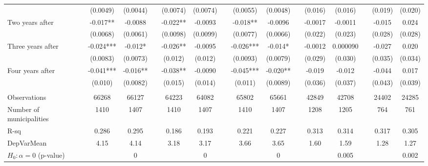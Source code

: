 \begin{tabular}{lcccccccccccccc}
      & (0.0049) & (0.0044) &       & (0.0074) & (0.0074) &       & (0.0055) & (0.0048) &       & (0.016) & (0.016) &       & (0.019) & (0.020) \\
Two years after & -0.017** & -0.0088 &       & -0.022** & -0.0093 &       & -0.018** & -0.0096 &       & -0.0017 & -0.0011 &       & -0.015 & 0.024 \\
      & (0.0068) & (0.0061) &       & (0.0098) & (0.0099) &       & (0.0077) & (0.0066) &       & (0.022) & (0.023) &       & (0.028) & (0.028) \\
Three years after & -0.024*** & -0.012* &       & -0.026** & -0.0095 &       & -0.026*** & -0.014* &       & -0.0012 & 0.000090 &       & -0.027 & 0.020 \\
      & (0.0083) & (0.0073) &       & (0.012) & (0.012) &       & (0.0093) & (0.0079) &       & (0.029) & (0.030) &       & (0.035) & (0.034) \\
Four years after & -0.041*** & -0.016** &       & -0.038** & -0.0090 &       & -0.045*** & -0.020** &       & -0.019 & -0.012 &       & -0.044 & 0.017 \\
      & (0.010) & (0.0082) &       & (0.015) & (0.014) &       & (0.011) & (0.0089) &       & (0.036) & (0.037) &       & (0.043) & (0.039) \\
      &       &       &       &       &       &       &       &       &       &       &       &       &       &  \\
\midrule
Observations & 66268 & 66127 &       & 64223 & 64082 &       & 65802 & 65661 &       & 42849 & 42708 &       & 24402 & 24285 \\
Number of municipalities & 1410  & 1407  &       & 1410  & 1407  &       & 1410  & 1407  &       & 1208  & 1205  &       & 764   & 761 \\
R-sq  & 0.286 & 0.295 &       & 0.186 & 0.193 &       & 0.221 & 0.227 &       & 0.313 & 0.314 &       & 0.317 & 0.305 \\
DepVarMean & 4.15  & 4.14  &       & 3.18  & 3.17  &       & 3.66  & 3.65  &       & 1.60  & 1.59  &       & 1.28  & 1.27 \\
$H_0 : \alpha = 0$ (p-value) &       & 0     &       &       & 0     &       &       & 0     &       &       & 0.005 &       &       & 0.002 \\
\bottomrule
\bottomrule
\end{tabular}%
